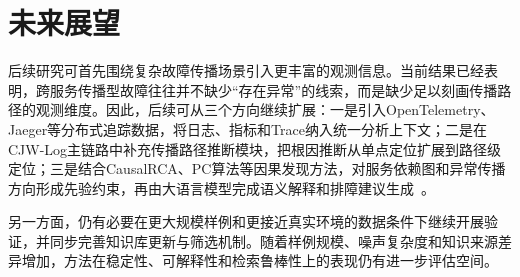\section{未来展望}

后续研究可首先围绕复杂故障传播场景引入更丰富的观测信息。当前结果已经表明，跨服务传播型故障往往并不缺少“存在异常”的线索，而是缺少足以刻画传播路径的观测维度。因此，后续可从三个方向继续扩展：一是引入OpenTelemetry、Jaeger等分布式追踪数据，将日志、指标和Trace纳入统一分析上下文；二是在CJW-Log主链路中补充传播路径推断模块，把根因推断从单点定位扩展到路径级定位；三是结合CausalRCA、PC算法等因果发现方法，对服务依赖图和异常传播方向形成先验约束，再由大语言模型完成语义解释和排障建议生成~\cite{xin2023causalrca,ikram2022causaldiscovery,cheng2023rcasurvey}。

另一方面，仍有必要在更大规模样例和更接近真实环境的数据条件下继续开展验证，并同步完善知识库更新与筛选机制。随着样例规模、噪声复杂度和知识来源差异增加，方法在稳定性、可解释性和检索鲁棒性上的表现仍有进一步评估空间。
